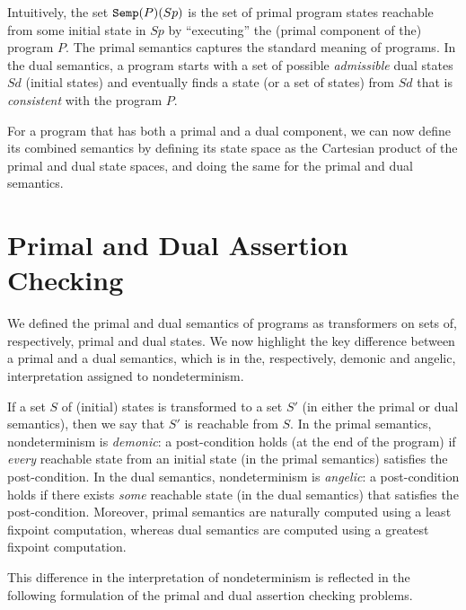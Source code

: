 \documentclass[preprint]{sig-alternate-05-2015}
\def\semp{{\tt{Semp}}}
\def\semd{{\tt{Semd}}}
\def\vmap{{\tt{vmap}}}
\begin{document}
Intuitively, the set $\semp(P)(Sp)$ is the set of primal program states reachable from some initial
state in $Sp$ by ``executing'' the (primal component of the) program $P$.
The primal semantics captures the standard meaning of programs.
%
%
In the dual semantics, a program starts with a set of
possible {\em{admissible}} dual states $Sd$ (initial states) and eventually
finds a state (or a set of states) from $Sd$ that is {\em{consistent}} with
the program $P$.

For a program that has both a primal and a dual component, we can now define its
combined semantics by defining its state space as the Cartesian product of the primal
and dual state spaces, and doing the same for the primal and dual semantics.


\section{Primal and Dual Assertion Checking}
\label{sec:assertionchecking}

We defined the primal and dual semantics of programs as
transformers on sets of, respectively, primal and dual states.
We now highlight the
key difference between a primal and a dual semantics,
which is in the, respectively, demonic and angelic,
interpretation assigned to nondeterminism.

If a set $S$ of (initial) states is transformed to a set
$S'$ (in either the primal or dual semantics), then we
say that $S'$ is reachable from $S$.
In the primal semantics, nondeterminism is {\em{demonic}}:
a post-condition holds (at the end of the program) if
{\em{every}} reachable state from an initial state
(in the primal semantics)
satisfies the post-condition.
In the dual semantics, nondeterminism is {\em{angelic}}:
a post-condition holds if
there exists
{\em{some}} reachable state (in the dual semantics)
that satisfies the post-condition.
Moreover, primal semantics are naturally computed using a
least fixpoint computation, whereas dual semantics are
computed using a greatest fixpoint computation.

This difference in the interpretation of nondeterminism
is reflected in the following formulation of the primal
and dual assertion checking problems.
\end{document}
